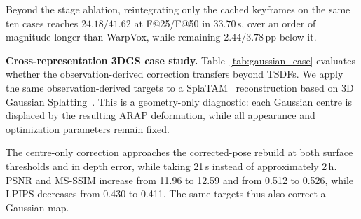 Beyond the stage ablation, reintegrating only the cached keyframes on the
same ten cases reaches $24.18/41.62$ at F@25/F@50 in $33.70$\,s, over an order
of magnitude longer than WarpVox, while remaining
$2.44/3.78$\,pp below it.

\noindent\textbf{Cross-representation 3DGS case study.}
Table~\ref{tab:gaussian_case} evaluates whether the observation-derived
correction transfers beyond TSDFs. We apply the same observation-derived
targets to a SplaTAM~\cite{keetha2024splatam} reconstruction based on 3D
Gaussian Splatting~\cite{kerbl2023gaussians}. This is a geometry-only
diagnostic: each Gaussian centre is displaced by the resulting ARAP
deformation, while all appearance and optimization parameters remain fixed.

The centre-only correction approaches the corrected-pose rebuild at both
surface thresholds and in depth error, while taking 21\,s instead of
approximately 2\,h. PSNR and MS-SSIM
increase from 11.96 to 12.59 and from 0.512 to 0.526, while LPIPS decreases
from 0.430 to 0.411. The same targets thus also correct a
Gaussian map.

\begin{table}[t]
\centering
\caption{\textbf{Gaussian case study on one Kimera-Multi sequence.}}
\label{tab:gaussian_case}
\scriptsize
\setlength{\tabcolsep}{2.3pt}
\end{table}
